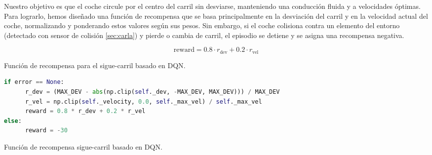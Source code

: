 Nuestro objetivo es que el coche circule por el centro del carril sin desviarse, manteniendo una conducción fluida y a velocidades óptimas. Para lograrlo, hemos diseñado una función de recompensa que se basa principalmente en la desviación del carril y en la velocidad actual del coche, normalizando y ponderando estos valores según sus pesos. Sin embargo, si el coche colisiona contra un elemento del entorno (detectado con sensor de colisión \ref{sec:carla}) y pierde o cambia de carril, el episodio se detiene y se asigna una recompensa negativa.
  \begin{myequation}[h]
    \begin{equation} 
      \text{reward} = 0.8 \cdot r_{\text{dev}} + 0.2 \cdot r_{\text{vel}} 
    \end{equation} 
    \caption{Función de recompensa para el sigue-carril basado en \ac{DQN}.}
\label{eq:rew_ppo}
  \end{myequation}
\begin{code}[h]
\begin{lstlisting}[language=Python]
if error == None:
      r_dev = (MAX_DEV - abs(np.clip(self._dev, -MAX_DEV, MAX_DEV))) / MAX_DEV
      r_vel = np.clip(self._velocity, 0.0, self._max_vel) / self._max_vel
      reward = 0.8 * r_dev + 0.2 * r_vel
else:
      reward = -30
\end{lstlisting}
\caption[Función de recompensa sigue-carril basado en \ac{DQN}]{Función de recompensa sigue-carril basado en \ac{DQN}.}
\label{cod:rew_dqn}
\end{code}

